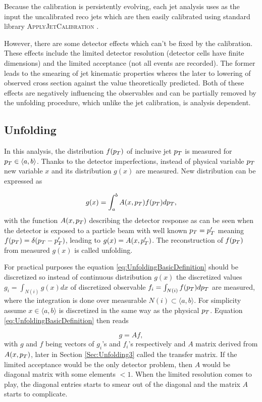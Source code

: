 Because the calibration is persistently evolving, each jet analysis uses as the
input the uncalibrated reco jets which are then easily calibrated using
standard library \textsc{ApplyJetCalibration} \cite{ApplyJetCalibration}.

However, there are some detector effects which can't be fixed by the calibration. These
effects include the limited detector resolution (detector cells have finite
dimensions) and the limited acceptance (not all events are recorded). The former
leads to the smearing of jet kinematic properties wheres the later to
lowering of observed cross section against the value theoretically
predicted. Both of these effects are negatively influencing the observables
and can be partially removed by the unfolding procedure, which unlike
the jet calibration, is analysis dependent. 

\subsection{Unfolding}

In this analysis, the distribution $f(p_{T})$ of inclusive jet $p_{T}$ is measured
for $p_{T} \in \langle a, b \rangle$. Thanks to the detector imperfections,
instead of physical variable $p_{T}$ new variable $x$ and its distribution
$g(x)$ are measured. New distribution can be expressed as

\begin{equation}
  g(x) = \int_a^b A(x, p_{T}) f(p_{T}) dp_{T},
  \label{eq:UnfoldingBasicDefinition}
\end{equation}
with the function $A(x, p_{T})$ describing the detector response as can be seen
when the detector is exposed to a particle beam with well known $p_{T} = p_{T}'$
meaning $f(p_{T}) = \delta(p_{T} - p_{T}')$, leading to $g(x) = A(x, p_{T}')$. The
reconstruction of $f(p_{T})$ from measured $g(x)$ is called unfolding.

For practical purposes the equation \eqref{eq:UnfoldingBasicDefinition} should
be discretized so instead of continuous distribution $g(x)$ the discretized
values $g_i = \int_{N(i)} g(x)dx$ of discretized observable $f_i =
\int_{N(i)} f(p_{T})dp_{T}$ are measured, where the integration is done over
measurable $N(i) \subset \langle a, b \rangle$. For simplicity assume $x \in
\langle a, b \rangle$ is discretized in the same way as the physical $p_{T}$.
Equation \eqref{eq:UnfoldingBasicDefinition} then reads

\begin{equation}
  g = Af,
  \label{eq:UnfoldingDiscretized}
\end{equation}
with $g$ and $f$ being vectors of $g_i$'s and $f_i$'s respectively and $A$
matrix derived from $A(x, p_{T})$, later in Section \ref{Sec:Unfolding3} called
the transfer matrix. If the limited acceptance would be the only detector
problem, then $A$ would be diagonal matrix with some elements $ < 1$. When the
limited resolution comes to play, the diagonal entries starts to smear out of
the diagonal and the matrix $A$ starts to complicate.

